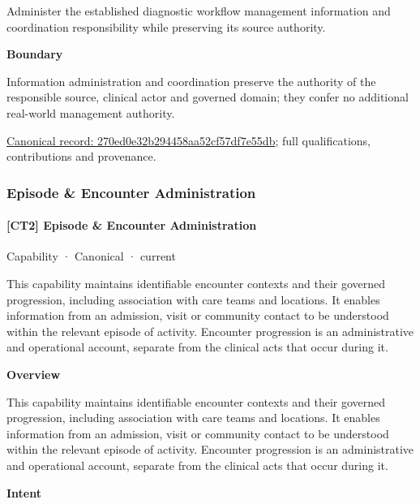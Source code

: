 Administer the established diagnostic workflow management information and coordination responsibility while preserving its source authority.



\textbf{Boundary}



Information administration and coordination preserve the authority of the responsible source, clinical actor and governed domain; they confer no additional real-world management authority.


{\footnotesize \href{../../../../continuum/strategy/capability/270ed0e32b294458aa52cf57df7e55db.md}{Canonical record: 270ed0e32b294458aa52cf57df7e55db}; full qualifications, contributions and provenance.}\par
\subsubsection{Episode \& Encounter Administration}

\paragraph{[CT2] Episode \& Encounter Administration}

\label{element:61d7067aee0540259b3daca4287d66d2}
{\small Capability · Canonical · current}\par

This capability maintains identifiable encounter contexts and their governed progression, including association with care teams and locations. It enables information from an admission, visit or community contact to be understood within the relevant episode of activity. Encounter progression is an administrative and operational account, separate from the clinical acts that occur during it.



\textbf{Overview}



This capability maintains identifiable encounter contexts and their governed progression, including association with care teams and locations. It enables information from an admission, visit or community contact to be understood within the relevant episode of activity. Encounter progression is an administrative and operational account, separate from the clinical acts that occur during it.



\textbf{Intent}



